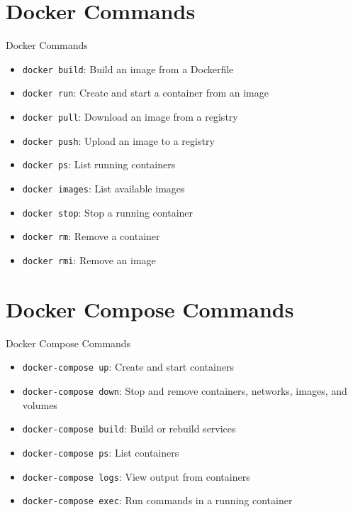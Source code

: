 \documentclass{beamer}
\begin{document}
\section{Docker Commands}

\begin{frame}{Docker Commands}

    \vspace{-20pt}
    \begin{itemize}
        \item \texttt{docker build}: Build an image from a Dockerfile
        \item \texttt{docker run}: Create and start a container from an image
        \item \texttt{docker pull}: Download an image from a registry
        \item \texttt{docker push}: Upload an image to a registry
        \item \texttt{docker ps}: List running containers
        \item \texttt{docker images}: List available images
        \item \texttt{docker stop}: Stop a running container
        \item \texttt{docker rm}: Remove a container
        \item \texttt{docker rmi}: Remove an image
    \end{itemize}
\end{frame}

\section{Docker Compose Commands}

\begin{frame}{Docker Compose Commands}

    \vspace{-20pt}
    \begin{itemize}
        \item \texttt{docker-compose up}: Create and start containers
        \item \texttt{docker-compose down}: Stop and remove containers, networks, images, and volumes
        \item \texttt{docker-compose build}: Build or rebuild services
        \item \texttt{docker-compose ps}: List containers
        \item \texttt{docker-compose logs}: View output from containers
        \item \texttt{docker-compose exec}: Run commands in a running container
    \end{itemize}
\end{frame}
\end{document}
